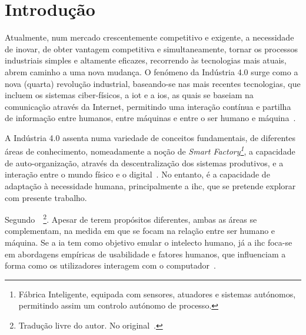 \chapter{Introdução}
\label{chap:Chapter1}
Atualmente, num mercado crescentemente competitivo e exigente, a necessidade de inovar, de obter vantagem competitiva e simultaneamente, tornar os processos industriais simples e altamente eficazes, recorrendo às tecnologias mais atuais, abrem caminho a uma nova mudança. O fenómeno da Indústria 4.0 surge como a nova (quarta) revolução industrial, baseando-se nas mais recentes tecnologias, que incluem os sistemas ciber-físicos, a \gls{iot} e a \gls{ios}, as quais se baseiam na comunicação através da Internet, permitindo uma interação contínua e partilha de informação entre humanos, entre máquinas e entre o ser humano e máquina~\parencite{complex_view_industry40}. 

A Indústria 4.0 assenta numa variedade de conceitos fundamentais, de diferentes áreas de conhecimento, nomeadamente a noção de \textit{Smart Factory\footnote{Fábrica Inteligente, equipada com sensores, atuadores e sistemas autónomos, permitindo assim um controlo autónomo de processo.}}, a capacidade de auto-organização, através da descentralização dos sistemas produtivos, e a interação entre o mundo físico e o digital~\parencite[Fundamental Concepts, p.240]{industry40}. No entanto, é a capacidade de adaptação à necessidade humana, principalmente a \gls{ihc}, que se pretende explorar com presente trabalho.

Segundo~\textcite[p.1]{natural_language_translation_intersaction_ai_hci}~\footnote{Tradução livre do autor. No original~.}. Apesar de terem propósitos diferentes, ambas as áreas se complementam, na medida em que se focam na relação entre ser humano e máquina. Se a \gls{ia} tem como objetivo emular o intelecto humano, já a \gls{ihc} foca-se em abordagens empíricas de usabilidade e fatores humanos, que influenciam a forma como os utilizadores interagem com o computador~\parencite{natural_language_translation_intersaction_ai_hci}. 

